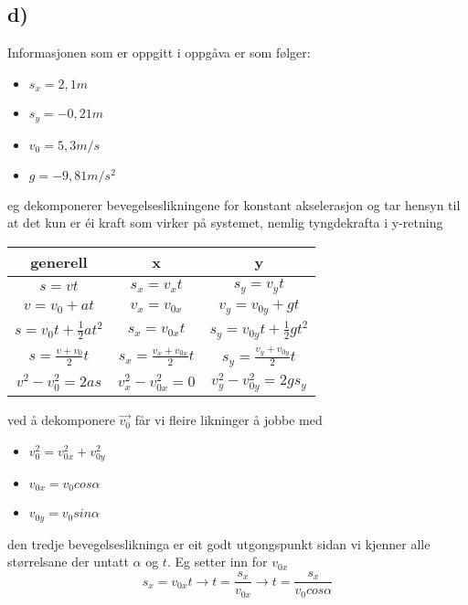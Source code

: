 \documentclass[12pt,a4paper]{article}
\begin{document}
    \subsection*{d)}
      Informasjonen som er oppgitt i oppgåva er som følger:
      \begin{itemize}
        \item $s_x = 2,1m$
        \item $s_y = -0,21m$
        \item $v_0 = 5,3m/s$
        \item $g = -9,81m/s^2$
      \end{itemize}
      eg dekomponerer bevegelseslikningene for konstant akselerasjon og
      tar hensyn til at det kun er éi kraft som virker på systemet, nemlig
      tyngdekrafta i y-retning
      
      \begin{center}
        \begin{tabular}{ |c|c|c| }
          \hline
          generell & x & y \\
          \hline
          $s=vt$ & $s_x = v_x t$ & $s_y = v_y t$ \\
          \hline
          $v=v_0 + at$ & $v_x = v_{0x}$ & $v_y = v_{0y}+gt$ \\
          \hline
          $s=v_0t + \frac{1}{2}at^2$ &
          $s_x=v_{0x}t$ &
          $s_y=v_{0y}t + \frac{1}{2}gt^2$ \\
          \hline
          $s=\frac{v+v_{0}}{2}t$ &
          $s_x=\frac{v_x+v_{0x}}{2}t$ &
          $s_y=\frac{v_y+v_{0y}}{2}t$ \\
          \hline
          $v^2 - v^2_{0} = 2as$ &
          $v^2_x - v^2_{0x} = 0$ &
          $v^2_y - v^2_{0y} = 2gs_y$ \\
          \hline

        \end{tabular}
      \end{center}
      ved å dekomponere $\vec{v_0}$ får vi fleire likninger å jobbe med
      \begin{itemize}
        \item $v_0^2 = v_{0x}^2 + v_{0y}^2$
        \item $v_{0x} = v_0 cos\alpha$
        \item $v_{0y} = v_0 sin\alpha$
      \end{itemize}
      den tredje bevegelseslikninga er eit godt utgongspunkt sidan vi kjenner
      alle størrelsane der untatt $\alpha$ og $t$. Eg setter inn for $v_{0x}$
      \begin{equation}
        s_x = v_{0x}t \rightarrow t = \frac{s_x}{v_{0x}}
        \rightarrow t = \frac{s_x}{v_0 cos \alpha}
      \end{equation}
\end{document}
